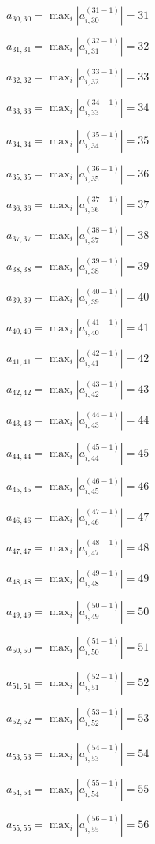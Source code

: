 \documentclass[a4paper,12pt]{article}
\begin{document}
$a _{ 30, 30 } =  \max _i |a _{ i, 30 } ^{ (31 - 1) } | = 31$

$a _{ 31, 31 } =  \max _i |a _{ i, 31 } ^{ (32 - 1) } | = 32$

$a _{ 32, 32 } =  \max _i |a _{ i, 32 } ^{ (33 - 1) } | = 33$

$a _{ 33, 33 } =  \max _i |a _{ i, 33 } ^{ (34 - 1) } | = 34$

$a _{ 34, 34 } =  \max _i |a _{ i, 34 } ^{ (35 - 1) } | = 35$

$a _{ 35, 35 } =  \max _i |a _{ i, 35 } ^{ (36 - 1) } | = 36$

$a _{ 36, 36 } =  \max _i |a _{ i, 36 } ^{ (37 - 1) } | = 37$

$a _{ 37, 37 } =  \max _i |a _{ i, 37 } ^{ (38 - 1) } | = 38$

$a _{ 38, 38 } =  \max _i |a _{ i, 38 } ^{ (39 - 1) } | = 39$

$a _{ 39, 39 } =  \max _i |a _{ i, 39 } ^{ (40 - 1) } | = 40$

$a _{ 40, 40 } =  \max _i |a _{ i, 40 } ^{ (41 - 1) } | = 41$

$a _{ 41, 41 } =  \max _i |a _{ i, 41 } ^{ (42 - 1) } | = 42$

$a _{ 42, 42 } =  \max _i |a _{ i, 42 } ^{ (43 - 1) } | = 43$

$a _{ 43, 43 } =  \max _i |a _{ i, 43 } ^{ (44 - 1) } | = 44$

$a _{ 44, 44 } =  \max _i |a _{ i, 44 } ^{ (45 - 1) } | = 45$

$a _{ 45, 45 } =  \max _i |a _{ i, 45 } ^{ (46 - 1) } | = 46$

$a _{ 46, 46 } =  \max _i |a _{ i, 46 } ^{ (47 - 1) } | = 47$

$a _{ 47, 47 } =  \max _i |a _{ i, 47 } ^{ (48 - 1) } | = 48$

$a _{ 48, 48 } =  \max _i |a _{ i, 48 } ^{ (49 - 1) } | = 49$

$a _{ 49, 49 } =  \max _i |a _{ i, 49 } ^{ (50 - 1) } | = 50$

$a _{ 50, 50 } =  \max _i |a _{ i, 50 } ^{ (51 - 1) } | = 51$

$a _{ 51, 51 } =  \max _i |a _{ i, 51 } ^{ (52 - 1) } | = 52$

$a _{ 52, 52 } =  \max _i |a _{ i, 52 } ^{ (53 - 1) } | = 53$

$a _{ 53, 53 } =  \max _i |a _{ i, 53 } ^{ (54 - 1) } | = 54$

$a _{ 54, 54 } =  \max _i |a _{ i, 54 } ^{ (55 - 1) } | = 55$

$a _{ 55, 55 } =  \max _i |a _{ i, 55 } ^{ (56 - 1) } | = 56$
\end{document}

